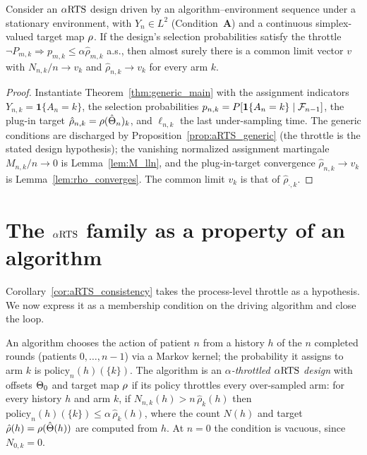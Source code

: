 \begin{corollary}
\label{cor:aRTS_consistency}
Consider an $\alpha\text{RTS}$ design driven by an algorithm–environment sequence under a stationary
environment, with $Y_n\in L^2$ (Condition~\textbf{A}) and a continuous simplex-valued target map
$\rho$. If the design's selection probabilities satisfy the throttle
$\neg P_{m,k}\Rightarrow p_{m,k}\le\alpha\hat\rho_{m,k}$ a.s., then almost surely there is a common
limit vector $v$ with $N_{n,k}/n\to v_k$ and $\hat\rho_{n,k}\to v_k$ for every arm $k$.
\end{corollary}

\begin{proof}
Instantiate Theorem~\ref{thm:generic_main} with the assignment indicators
$Y_{n,k}=\mathbf 1\{A_n=k\}$, the selection probabilities
$p_{n,k}=P[\mathbf 1\{A_n=k\}\mid\mathcal{F}_{n-1}]$, the plug-in target
$\hat\rho_{n,k}=\rho(\hat{\Theta}_n)_k$, and $\ell_{n,k}$ the last under-sampling time. The generic
conditions are discharged by Proposition~\ref{prop:aRTS_generic} (the throttle is the stated design
hypothesis); the vanishing normalized assignment martingale $M_{n,k}/n\to0$ is
Lemma~\ref{lem:M_lln}, and the plug-in-target convergence $\hat\rho_{n,k}\to v_k$ is
Lemma~\ref{lem:rho_converges}. The common limit $v_k$ is that of $\hat\rho_{\cdot,k}$.
\end{proof}

\section{The \texorpdfstring{$\alpha\text{RTS}$}{aRTS} family as a property of an algorithm}
\label{sec:aRTS_alg}

Corollary~\ref{cor:aRTS_consistency} takes the process-level throttle as a hypothesis. We now
express it as a membership condition on the driving algorithm and close the loop.

\begin{definition}\label{def:aRTS_alg}
\leanok
{}
An algorithm chooses the action of patient $n$ from a history $h$ of the $n$ completed rounds
(patients $0,\dots,n-1$) via a Markov kernel; the probability it assigns to arm $k$ is
$\mathrm{policy}_n(h)(\{k\})$. The algorithm
is an \emph{$\alpha$-throttled $\alpha\text{RTS}$ design} with offsets $\Theta_0$ and target map $\rho$ if
its policy throttles every over-sampled arm: for every history $h$ and arm $k$, if
$N_{n,k}(h) > n\,\hat\rho_k(h)$ then $\mathrm{policy}_n(h)(\{k\}) \le \alpha\,\hat\rho_k(h)$,
where the count $N(h)$ and target $\hat\rho(h)=\rho(\hat{\Theta}(h))$ are computed from $h$.
At $n=0$ the condition is vacuous, since $N_{0,k}=0$.
\end{definition}

